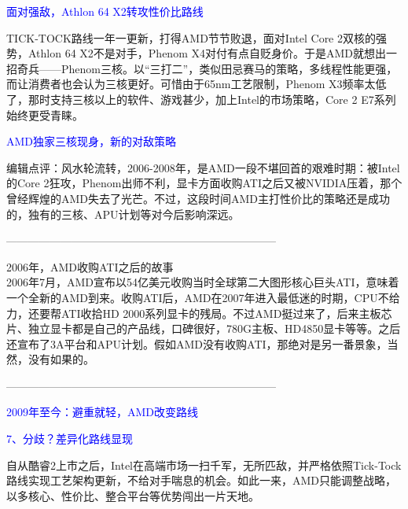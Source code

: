 \documentclass[utf8]{book}
\begin{document}
	\begin{flushleft}
		{\large \textcolor{blue}{面对强敌，Athlon 64 X2转攻性价比路线\\}}
	\end{flushleft}

	TICK-TOCK路线一年一更新，打得AMD节节败退，面对Intel Core 2双核的强势，Athlon 64 X2不是对手，Phenom X4对付有点自贬身价。于是AMD就想出一招奇兵——Phenom三核。以“三打二”，类似田忌赛马的策略，多线程性能更强，而让消费者也会认为三核更好。可惜由于65nm工艺限制，Phenom X3频率太低了，那时支持三核以上的软件、游戏甚少，加上Intel的市场策略，Core 2 E7系列始终更受青睐。
	
	
	\begin{flushleft}
		{\large \textcolor{blue}{AMD独家三核现身，新的对敌策略\\}}
	\end{flushleft}

	编辑点评：风水轮流转，2006-2008年，是AMD一段不堪回首的艰难时期：被Intel的Core 2狂攻，Phenom出师不利，显卡方面收购ATI之后又被NVIDIA压着，那个曾经辉煌的AMD失去了光芒。不过，这段时间AMD主打性价比的策略还是成功的，独有的三核、APU计划等对今后影响深远。
	
	--------------------------------------------------------------------------
	
	2006年，AMD收购ATI之后的故事\\
	2006年7月，AMD宣布以54亿美元收购当时全球第二大图形核心巨头ATI，意味着一个全新的AMD到来。收购ATI后，AMD在2007年进入最低迷的时期，CPU不给力，还要帮ATI收拾HD 2000系列显卡的残局。不过AMD挺过来了，后来主板芯片、独立显卡都是自己的产品线，口碑很好，780G主板、HD4850显卡等等。之后还宣布了3A平台和APU计划。假如AMD没有收购ATI，那绝对是另一番景象，当然，没有如果的。
	
	--------------------------------------------------------------------------
	
	\begin{flushleft}
		{\Large \textcolor{blue}{2009年至今：避重就轻，AMD改变路线}}
	\end{flushleft}
	
	\begin{flushleft}
		{\large \textcolor{blue}{7、分歧？差异化路线显现\\}}
	\end{flushleft}

	自从酷睿2上市之后，Intel在高端市场一扫千军，无所匹敌，并严格依照Tick-Tock路线实现工艺架构更新，不给对手喘息的机会。如此一来，AMD只能调整战略，以多核心、性价比、整合平台等优势闯出一片天地。
	
\end{document}
